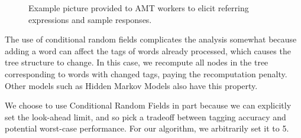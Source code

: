 \documentclass[conference]{IEEEtran}
\numberwithin{equation}{section}
\begin{document}
\begin{figure}[!tb]
  \centering
  \setlength\extrarowheight{0pt}
	\caption{Example picture provided to AMT workers to elicit referring expressions and sample responses.}
	\label{fig:ref_expr_examples_pic}
\end{figure}

The use of conditional random fields complicates the analysis somewhat because adding a word can affect the tags of words already processed, which causes the tree structure to change. In this case, we recompute all nodes in the tree corresponding to words with changed tags, paying the recomputation penalty. Other models such as Hidden Markov Models also have this property.


We choose to use Conditional Random Fields in part because we can explicitly set the look-ahead limit, and so pick a tradeoff between tagging accuracy and potential worst-case performance. For our algorithm, we arbitrarily set it to 5.
\end{document}
